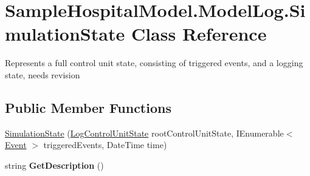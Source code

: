 \hypertarget{class_sample_hospital_model_1_1_model_log_1_1_simulation_state}{}\section{Sample\+Hospital\+Model.\+Model\+Log.\+Simulation\+State Class Reference}
\label{class_sample_hospital_model_1_1_model_log_1_1_simulation_state}


Represents a full control unit state, consisting of triggered events, and a logging state, needs revision  


\subsection*{Public Member Functions}
\begin{DoxyCompactItemize}
\item 
\hyperlink{class_sample_hospital_model_1_1_model_log_1_1_simulation_state_ab084b40b26d2f2be2d26034aeb22db1b}{Simulation\+State} (\hyperlink{class_sample_hospital_model_1_1_model_log_1_1_log_control_unit_state}{Log\+Control\+Unit\+State} root\+Control\+Unit\+State, I\+Enumerable$<$ \hyperlink{class_simulation_core_1_1_h_c_c_m_elements_1_1_event}{Event} $>$ triggered\+Events, Date\+Time time)
\item 
string {\bfseries Get\+Description} ()\hypertarget{class_sample_hospital_model_1_1_model_log_1_1_simulation_state_a9eccfee73a11ae96c236210c96daf9ba}{}\label{class_sample_hospital_model_1_1_model_log_1_1_simulation_state_a9eccfee73a11ae96c236210c96daf9ba}

\end{DoxyCompactItemize}
